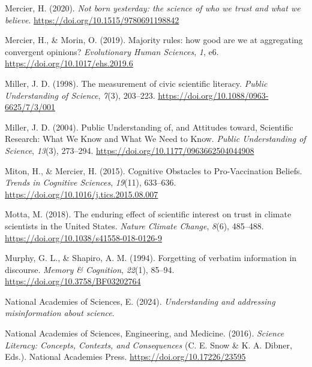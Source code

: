 \documentclass[
  jou,
  floatsintext,
  longtable,
  nolmodern,
  notxfonts,
  notimes,
  colorlinks=true,linkcolor=blue,citecolor=blue,urlcolor=blue]{apa7}
\newlength{\cslhangindent}
\newenvironment{CSLReferences}[2] %
 {\begin{list}{}{%
  \setlength{\itemindent}{0pt}
  \setlength{\leftmargin}{0pt}
  \setlength{\parsep}{0pt}
  \ifodd #1
   \setlength{\leftmargin}{\cslhangindent}
   \setlength{\itemindent}{-1\cslhangindent}
  \fi
  \setlength{\itemsep}{#2\baselineskip}}}
 {\end{list}}
\begin{document}
\begin{CSLReferences}{1}{0}
Mercier, H. (2020). \emph{Not born yesterday: the science of who we
trust and what we believe}. \url{https://doi.org/10.1515/9780691198842}

Mercier, H., \& Morin, O. (2019). Majority rules: how good are we at
aggregating convergent opinions? \emph{Evolutionary Human Sciences},
\emph{1}, e6. \url{https://doi.org/10.1017/ehs.2019.6}

Miller, J. D. (1998). The measurement of civic scientific literacy.
\emph{Public Understanding of Science}, \emph{7}(3), 203--223.
\url{https://doi.org/10.1088/0963-6625/7/3/001}

Miller, J. D. (2004). Public Understanding of, and Attitudes toward,
Scientific Research: What We Know and What We Need to Know. \emph{Public
Understanding of Science}, \emph{13}(3), 273--294.
\url{https://doi.org/10.1177/0963662504044908}

Miton, H., \& Mercier, H. (2015). Cognitive Obstacles to Pro-Vaccination
Beliefs. \emph{Trends in Cognitive Sciences}, \emph{19}(11), 633--636.
\url{https://doi.org/10.1016/j.tics.2015.08.007}

Motta, M. (2018). The enduring effect of scientific interest on trust in
climate scientists in the United States. \emph{Nature Climate Change},
\emph{8}(6), 485--488. \url{https://doi.org/10.1038/s41558-018-0126-9}

Murphy, G. L., \& Shapiro, A. M. (1994). Forgetting of verbatim
information in discourse. \emph{Memory \& Cognition}, \emph{22}(1),
85--94. \url{https://doi.org/10.3758/BF03202764}

National Academies of Sciences, E. (2024). \emph{Understanding and
addressing misinformation about science}.

National Academies of Sciences, Engineering, and Medicine. (2016).
\emph{Science Literacy: Concepts, Contexts, and Consequences} (C. E.
Snow \& K. A. Dibner, Eds.). National Academies Press.
\url{https://doi.org/10.17226/23595}


\end{CSLReferences}
\end{document}
